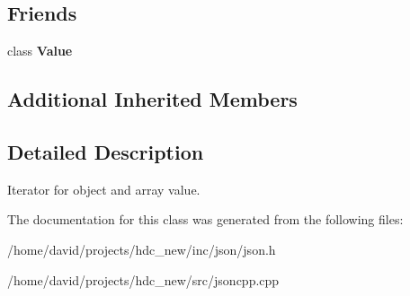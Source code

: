 \subsection*{Friends}
\begin{DoxyCompactItemize}
\item 
class {\bfseries Value}\hypertarget{class_json_1_1_value_iterator_aeceedf6e1a7d48a588516ce2b1983d6f}{}\label{class_json_1_1_value_iterator_aeceedf6e1a7d48a588516ce2b1983d6f}

\end{DoxyCompactItemize}
\subsection*{Additional Inherited Members}


\subsection{Detailed Description}
Iterator for object and array value. 

The documentation for this class was generated from the following files\+:\begin{DoxyCompactItemize}
\item 
/home/david/projects/hdc\+\_\+new/inc/json/json.\+h\item 
/home/david/projects/hdc\+\_\+new/src/jsoncpp.\+cpp\end{DoxyCompactItemize}
